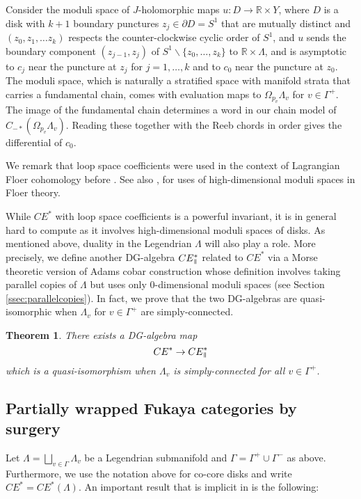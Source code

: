 \documentclass{gtpart}
\newtheorem{thm}{Theorem}
\renewcommand{\parallel}{{\mkern3mu\vphantom{\perp}\vrule depth 0pt\mkern2mu\vrule depth
0pt\mkern3mu}}
\begin{document}
Consider the moduli space of $J$-holomorphic maps  $u\colon D \to \mathbb{R} \times Y$, where $D$ is a disk with $k+1$ boundary
punctures $z_j \in \partial D = S^1$ that are mutually distinct and $(z_0,z_1,\ldots z_k)$ respects
the counter-clockwise cyclic order of
    $S^1$, and $u$ sends the boundary component $(z_{j-1},z_{j})$  of $S^1          \backslash \{z_0,\ldots,
        z_k \}$ to $\mathbb{R} \times \Lambda$, and is asymptotic to $c_j$ near the puncture at
        $z_j$ for $j=1,\ldots, {k}$ and to $c_0$ near the puncture at $z_0$. The moduli space,
        which is naturally a stratified space with manifold strata that carries a fundamental chain, comes with evaluation maps to $\Omega_{p_v}
        \Lambda_v$ for $v \in \Gamma^{+}$. The image of the fundamental chain determines a word in our chain model of
        $C_{-*}(\Omega_{p_v} \Lambda_v)$. Reading these together with the Reeb chords in order gives
        the differential of $c_0$. 
        
We remark that loop space coefficients were used in the
        context of Lagrangian Floer cohomology before \cite{barcor,Fuk}. See also \cite{abloop},
        \cite{CL} for uses of high-dimensional moduli spaces in Floer theory.  


While $CE^*$ with loop space coefficients is a powerful invariant, it is in general hard to compute
as it involves high-dimensional moduli spaces of disks. As mentioned above, duality in the Legendrian $\Lambda$ will also play a role. More precisely, we define
another DG-algebra $CE^{\ast}_{\parallel}$ related to $CE^*$ via a Morse theoretic version of Adams
cobar construction whose definition involves taking parallel copies of $\Lambda$ but uses only
0-dimensional moduli spaces (see Section \ref{ssec:parallelcopies}). In fact, we prove that the two
DG-algebras are quasi-isomorphic when $\Lambda_{v}$ for $v \in \Gamma^{+}$ are simply-connected. 

\begin{thm} There exists a DG-algebra map 
    \[ CE^* \to CE^*_{\parallel} \]
    which is a quasi-isomorphism when $\Lambda_v$ is simply-connected for all $v \in \Gamma^{+}$.
\end{thm} 

\subsection{Partially wrapped Fukaya categories by surgery}\label{ssec:partwrap} 
Let $\Lambda=\bigsqcup_{v\in\Gamma}\Lambda_{v}$ be a Legendrian submanifold and $\Gamma=\Gamma^{+}\cup\Gamma^{-}$ as above. Furthermore, we use the notation above for co-core disks and write $CE^{\ast}=CE^{\ast}(\Lambda)$.  An important result that is implicit in \cite[Remark 5.9]{BEE} is the following: 
\end{document}
